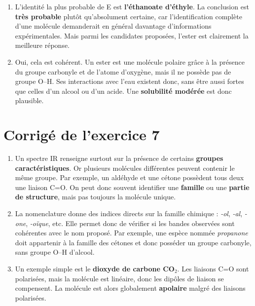 \documentclass[11pt,a4paper]{article}
\begin{document}
\begin{enumerate}[label=\textbf{\arabic*.},leftmargin=1.2em]
    \item L'identité la plus probable de E est \textbf{l'éthanoate d'éthyle}. La conclusion est \textbf{très probable} plutôt qu'absolument certaine, car l'identification complète d'une molécule demanderait en général davantage d'informations expérimentales. Mais parmi les candidates proposées, l'ester est clairement la meilleure réponse.

    \item Oui, cela est cohérent. Un ester est une molécule polaire grâce à la présence du groupe carbonyle et de l'atome d'oxygène, mais il ne possède pas de groupe O--H. Ses interactions avec l'eau existent donc, sans être aussi fortes que celles d'un alcool ou d'un acide. Une \textbf{solubilité modérée} est donc plausible.
\end{enumerate}

\section*{Corrigé de l'exercice 7}
\begin{enumerate}[label=\textbf{\arabic*.},leftmargin=1.2em]
    \item Un spectre IR renseigne surtout sur la présence de certains \textbf{groupes caractéristiques}. Or plusieurs molécules différentes peuvent contenir le même groupe. Par exemple, un aldéhyde et une cétone possèdent tous deux une liaison C=O. On peut donc souvent identifier une \textbf{famille} ou une \textbf{partie de structure}, mais pas toujours la molécule unique.

    \item La nomenclature donne des indices directs sur la famille chimique : \textit{-ol}, \textit{-al}, \textit{-one}, \textit{-oïque}, etc. Elle permet donc de vérifier si les bandes observées sont cohérentes avec le nom proposé. Par exemple, une espèce nommée \textit{propanone} doit appartenir à la famille des cétones et donc posséder un groupe carbonyle, sans groupe O--H d'alcool.

    \item Un exemple simple est le \textbf{dioxyde de carbone CO$_2$}. Les liaisons C=O sont polarisées, mais la molécule est linéaire, donc les dipôles de liaison se compensent. La molécule est alors globalement \textbf{apolaire} malgré des liaisons polarisées.
\end{enumerate}

\vfill
\end{document}
